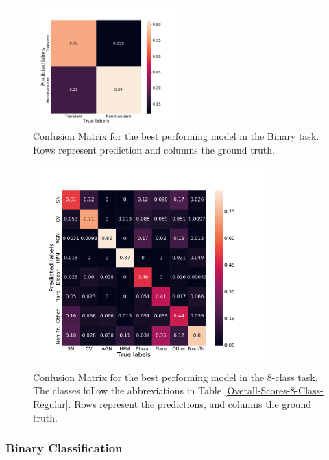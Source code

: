 \documentclass[twocolumn]{aastex62}
\begin{document}
\begin{figure}
\begin{center}
  \includegraphics[width=0.5\textwidth]{normalizedCMBinary.pdf}
\end{center}
  \caption{Confusion Matrix for the best performing model in the
    Binary task. Rows represent prediction and columns the ground
    truth.} 
  \label{fig:normalizedBinaryCM}
\end{figure} 


\begin{figure}
\begin{center}
\includegraphics[width=0.8\textwidth]{normalizedCM.pdf}
\end{center}
  \caption{Confusion Matrix for the best performing model in the 8-class
  task. The classes follow the abbreviations in Table
  \ref{Overall-Scores-8-Class-Regular}. Rows represent the
  predictions, and columns the ground truth.} 
  \label{fig:normalized8ClassCM}
\end{figure} 



\subsubsection{Binary Classification} 
\label{Results-Binary} 
\end{document}
